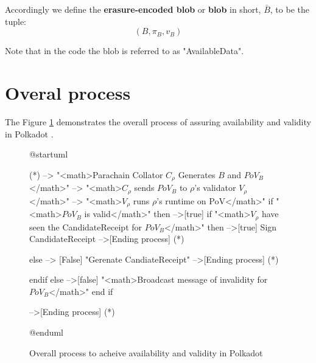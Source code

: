 \begin{definition}
  \label{defn-blob}
  Accordingly we define the {\bf erasure-encoded blob} or {\bf blob} in short,
  {\bf $\bar{B}$}, to be the tuple:
  \[
  (B, \pi_B, v_B)
  \]
\end{definition}

Note that in the code the blob is referred to as "AvailableData".

\section{Overal process}

The Figure \ref{diag-anv-overall} demonstrates the overall process of assuring
availability and validity in Polkadot .

\begin{figure}[h!]
\label{diag-anv-overall}
\begin{plantuml}
@startuml

(*) --> "<math>Parachain Collator $C_\rho$ Generates  $B$ and $PoV_B$</math>"
    --> "<math>$C_\rho$ sends $PoV_B$ to $\rho$'s validator $V_\rho$</math>"
    --> "<math>$V_{\rho}$ runs $\rho$'s runtime on PoV</math>"
    if "<math>$PoV_B$ is valid</math>" then
    -->[true] if  "<math>$V_{\rho}$ have seen the CandidateReceipt for $PoV_B$</math>" then
    -->[true] Sign CandidateReceipt
    -->[Ending process] (*)

    else
    --> [False] "Gerenate CandiateReceipt"
    -->[Ending process] (*)

    endif
    else
    -->[false] "<math>Broadcast message of invalidity for $PoV_B$</math>"
    end if

  -->[Ending process] (*)

@enduml
\end{plantuml}
\caption{Overall process to acheive availability and validity in Polkadot}
\end{figure}
